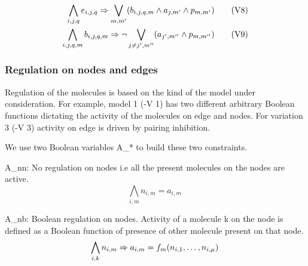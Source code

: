 
\begin{align}
  \bigwedge\limits_{i,j,q} e_{i,j,q} \Rightarrow \bigvee_{m,m^{\prime}} (b_{i,j,q,m} \land a_{j,m^{\prime}} \land p_{m,m^{\prime}})
  \tag{V8}\label{eq:fuse1}  \\
\bigwedge\limits_{i,j,q,m} b_{i,j,q,m} \Rightarrow \neg \bigvee_{j \neq j^{\prime}, m^{\prime\prime}} ( a_{j^{\prime},m^{\prime\prime}} \land p_{m,m^{\prime\prime}})
  \tag{V9}\label{eq:fuse2}  
\end{align}



\subsubsection{Regulation on nodes and edges}
%
Regulation of the molecules is based on the kind of the model under
consideration.
%
For example, model 1 (-V 1) has two different arbitrary
Boolean functions dictating the activity of the molecules on edge and
nodes.
%
For variation 3 (-V 3) activity on edge is driven by pairing
inhibition.  

We use two Boolean variables A\_* to build these two constraints. \newline

A\_nn: No regulation on nodes i.e all the present molecules on the nodes are active.
\[
\bigwedge\limits_{i,m} n_{i,m} = a_{i,m} \,
\]  

A\_nb: Boolean regulation on nodes. Activity of a molecule k on the node is defined as a Boolean function of presence of other molecule present on that node.
\[ \bigwedge\limits_{i,k} n_{i,m} \Rightarrow a_{i,m} =   f_m (n_{i,1},\dots,n_{i,\mu}) \, \]

